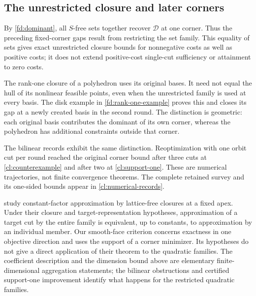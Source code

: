 \subsection{The unrestricted closure and later corners}\label{cl:unrestricted}

By \cref{fd:dominant}, all $S$-free sets together recover
$\mathcal D$ at one corner. Thus the preceding fixed-corner gaps result
from restricting the set family. This equality of sets gives exact
unrestricted closure bounds for nonnegative costs as well as positive
costs; it does not extend positive-cost single-cut sufficiency or
attainment to zero costs.

The rank-one closure of a polyhedron uses its original bases. It need not
equal the hull of its nonlinear feasible points, even when the
unrestricted family is used at every basis. The disk example in
\cref{fd:rank-one-example} proves this and closes its gap at a newly
created basis in the second round. The distinction is geometric: each
original basis contributes the dominant of its own corner, whereas the
polyhedron has additional constraints outside that corner.

The bilinear records exhibit the same distinction. Reoptimization with
one orbit cut per round reached the original corner bound after three
cuts at \cref{cl:counterexample} and after two at
\cref{cl:support-one}. These are numerical trajectories, not finite
convergence theorems. The complete retained survey and its one-sided
bounds appear in \cref{cl:numerical-records}.

\citet{ABP2018} study constant-factor approximation by lattice-free
closures at a fixed apex. Under their closure and target-representation
hypotheses, approximation of a target cut by the entire family is
equivalent, up to constants, to approximation by an individual member.
Our smooth-face criterion concerns exactness in one objective direction
and uses the support of a corner minimizer. Its hypotheses do not give
a direct application of their theorem to the quadratic families.
The coefficient description and the dimension bound above are elementary
finite-dimensional aggregation statements; the bilinear obstructions and
certified support-one improvement identify what happens for the
restricted quadratic families.
